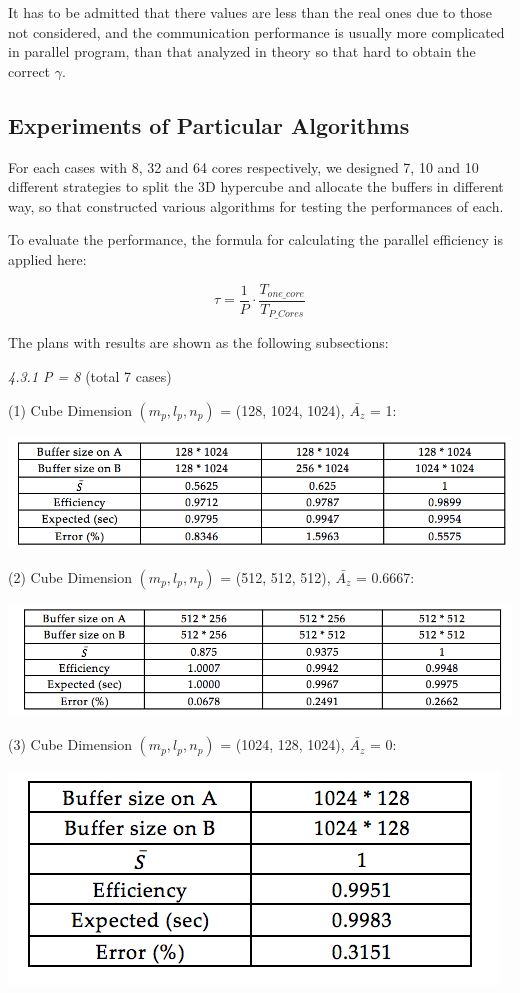\documentclass{amsart}
\theoremstyle{definition}
\theoremstyle{remark}
\numberwithin{equation}{section}
\begin{document}
It has to be admitted that there values are less than the real ones due to those not considered, and the communication performance is usually more complicated in parallel program, than that analyzed in theory so that hard to obtain the correct $\gamma$.

\subsection{Experiments of Particular Algorithms}

For each cases with 8, 32 and 64 cores respectively, we designed 7, 10 and 10 different strategies to split the 3D hypercube and allocate the buffers in different way, so that constructed various algorithms for testing the performances of each. 

To evaluate the performance, the formula for calculating the parallel efficiency is applied here:

\begin{equation}
\tau = \frac{1}{P} \cdot \frac{T_{one \_ core}}{T_{P \_ Cores}}
\end{equation}

The plans with results  are shown as the following subsections:

\emph{4.3.1 P = 8} (total 7 cases)

(1) Cube Dimension $(m_p , l_p, n_p)$ = (128, 1024, 1024), $\bar{A_z}$ = 1:

\includegraphics[scale=0.8]{figures/table_p8_1.png}

(2) Cube Dimension $(m_p , l_p, n_p)$ = (512, 512, 512), $\bar{A_z}$ = 0.6667:

\includegraphics[scale=0.8]{figures/table_p8_2.png}

(3) Cube Dimension $(m_p , l_p, n_p)$ = (1024, 128, 1024), $\bar{A_z}$ = 0:

\includegraphics[scale=0.8]{figures/table_p8_3.png}
\end{document}

